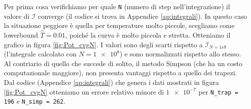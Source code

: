 \documentclass[a4paper, titlepage]{article}
\begin{document}
Per prima cosa verifichiamo per quale \texttt{N} (numero di step nell'integrazione) il valore di $\mathcal{I}$ converge (il codice si trova in Appendice \ref{ap:integrali}).
In questo caso la situazione peggiore è quella per temperature molto piccole, scegliamo come lowerbound $\hat T = 0.01$, poiché la curva è molto piccola e stretta.
Otteniamo il grafico in figura \ref{fig:Pot_cvgN}.
I valori sono degli scarti rispetto a $\mathcal{I}_{N = 1e8}$ (l'integrale calcolato con $N = \num{1e8}$) e sono normalizzati rispetto allo stesso.
Al contriario di quello che succede di solito, il metodo Simpson (che ha un costo computazionale maggiore), non presenta vantaggi rispetto a quello dei trapezi.
Dal codice (Appendice \ref{ap:integrali}) che genera i dati mostrati in figura \ref{fig:Pot_cvgN} otteniamo un errore relativo minore di $\num{1e-7}$ per \texttt{N\_trap = 196} e \texttt{N\_simp = 262}.
\end{document}
